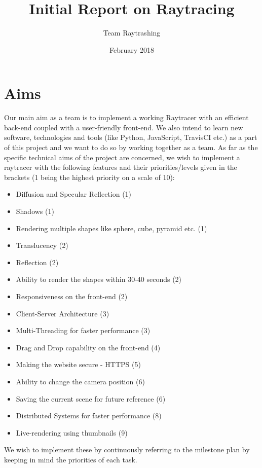\documentclass[10pt]{scrartcl}
\begin{document}
 

\title{Initial Report on Raytracing}
\author{Team Raytrashing}
\date{February 2018}

\maketitle

\section{Aims}
Our main aim as a team is to implement a working Raytracer with an efficient back-end coupled with a user-friendly front-end. We also intend to learn new software, technologies and tools (like Python, JavaScript, TravisCI etc.) as a part of this project and we want to do so by working together as a team. 
As far as the specific technical aims of the project are concerned, we wish to implement a raytracer with the following features and their priorities/levels given in the brackets (1 being the highest priority on a scale of 10):
\begin{itemize}
    \item Diffusion and Specular Reflection (1)
    \item Shadows (1)
    \item Rendering multiple shapes like sphere, cube, pyramid etc. (1)
    \item Translucency (2)
    \item Reflection (2)
    \item Ability to render the shapes within 30-40 seconds (2)
    \item Responsiveness on the front-end (2)
    \item Client-Server Architecture (3)
    \item Multi-Threading for faster performance (3)
    \item Drag and Drop capability on the front-end (4)
    \item Making the website secure - HTTPS (5)
    \item Ability to change the camera position (6)
    \item Saving the current scene for future reference (6)
    \item Distributed Systems for faster performance (8)
    \item Live-rendering using thumbnails (9)
\end{itemize}
We wish to implement these by continuously referring to the milestone plan by keeping in mind the priorities of each task.
\end{document}
